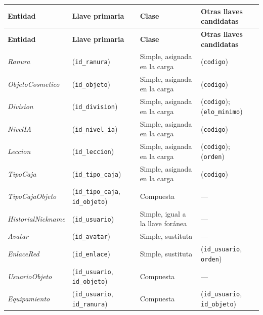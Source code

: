 \begin{center}\small
\begin{longtable}{|L{0.21\textwidth}|L{0.28\textwidth}|L{0.18\textwidth}|L{0.21\textwidth}|}
\hline
\textbf{Entidad} & \textbf{Llave primaria} & \textbf{Clase} & \textbf{Otras llaves candidatas} \\ \hline
\endfirsthead
\hline
\textbf{Entidad} & \textbf{Llave primaria} & \textbf{Clase} & \textbf{Otras llaves candidatas} \\ \hline
\endhead
\textit{Ranura} & (\texttt{id\_\allowbreak{}ranura}) & Simple, asignada en la carga & (\texttt{codigo}) \\ \hline
\textit{Objeto\-Cosmetico} & (\texttt{id\_\allowbreak{}objeto}) & Simple, asignada en la carga & (\texttt{codigo}) \\ \hline
\textit{Division} & (\texttt{id\_\allowbreak{}division}) & Simple, asignada en la carga & (\texttt{codigo}); (\texttt{elo\_\allowbreak{}minimo}) \\ \hline
\textit{Nivel\-IA} & (\texttt{id\_\allowbreak{}nivel\_\allowbreak{}ia}) & Simple, asignada en la carga & (\texttt{codigo}) \\ \hline
\textit{Leccion} & (\texttt{id\_\allowbreak{}leccion}) & Simple, asignada en la carga & (\texttt{codigo}); (\texttt{orden}) \\ \hline
\textit{Tipo\-Caja} & (\texttt{id\_\allowbreak{}tipo\_\allowbreak{}caja}) & Simple, asignada en la carga & (\texttt{codigo}) \\ \hline
\textit{Tipo\-Caja\-Objeto} & (\texttt{id\_\allowbreak{}tipo\_\allowbreak{}caja}, \texttt{id\_\allowbreak{}objeto}) & Compuesta & --- \\ \hline
\textit{Historial\-Nickname} & (\texttt{id\_\allowbreak{}usuario}) & Simple, igual a la llave foránea & --- \\ \hline
\textit{Avatar} & (\texttt{id\_\allowbreak{}avatar}) & Simple, sustituta & --- \\ \hline
\textit{Enlace\-Red} & (\texttt{id\_\allowbreak{}enlace}) & Simple, sustituta & (\texttt{id\_\allowbreak{}usuario}, \texttt{orden}) \\ \hline
\textit{Usuario\-Objeto} & (\texttt{id\_\allowbreak{}usuario}, \texttt{id\_\allowbreak{}objeto}) & Compuesta & --- \\ \hline
\textit{Equipamiento} & (\texttt{id\_\allowbreak{}usuario}, \texttt{id\_\allowbreak{}ranura}) & Compuesta & (\texttt{id\_\allowbreak{}usuario}, \texttt{id\_\allowbreak{}objeto}) \\ \hline

\end{longtable}
\end{center}
